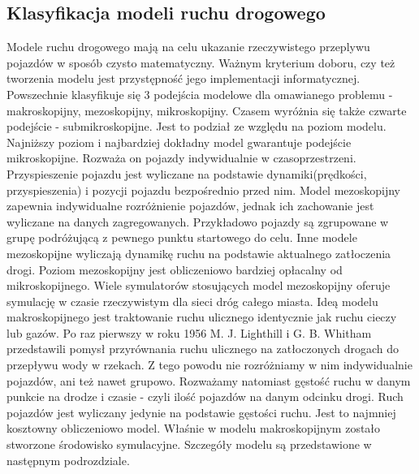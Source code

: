 \documentclass[11pt]{IEEEtran}
\begin{document}
\subsection{Klasyfikacja modeli ruchu drogowego} 
Modele ruchu drogowego mają na celu ukazanie rzeczywistego przeplywu pojazdów w sposób czysto matematyczny. Ważnym kryterium doboru, czy też tworzenia modelu jest przystępność jego implementacji informatycznej. Powszechnie klasyfikuje się 3 podejścia modelowe dla omawianego problemu \cite{CompareModels} - makroskopijny, mezoskopijny, mikroskopijny. Czasem \cite{multilevel} wyróżnia się także czwarte podejście - submikroskopijne. Jest to podział ze względu na poziom modelu. Najniższy poziom i najbardziej dokładny model gwarantuje podejście mikroskopijne. Rozważa on pojazdy indywidualnie w czasoprzestrzeni. Przyspieszenie pojazdu jest wyliczane na podstawie dynamiki(prędkości, przyspieszenia) i pozycji pojazdu bezpośrednio przed nim. Model mezoskopijny zapewnia indywidualne rozróżnienie pojazdów, jednak ich zachowanie jest wyliczane na danych zagregowanych\cite{mesoscopic}. Przykładowo pojazdy są zgrupowane w grupę podróżującą z pewnego punktu startowego do celu. Inne modele \cite{mesoscopic2} mezoskopijne wyliczają dynamikę ruchu na podstawie aktualnego zatłoczenia drogi. Poziom mezoskopijny jest obliczeniowo bardziej opłacalny od mikroskopijnego.
Wiele symulatorów stosujących model mezoskopijny oferuje symulację w czasie rzeczywistym dla sieci dróg całego miasta\cite{vu2017high}. Ideą modelu makroskopijnego jest traktowanie ruchu ulicznego identycznie jak ruchu cieczy lub gazów. Po raz pierwszy w roku 1956 M. J. Lighthill i G. B. Whitham \cite{lwr} przedstawili pomysł przyrównania ruchu ulicznego na zatłoczonych drogach do przepływu wody w rzekach. Z tego powodu nie rozróżniamy w nim indywidualnie pojazdów, ani też nawet grupowo. Rozważamy natomiast gęstość ruchu w danym punkcie na drodze i czasie - czyli ilość pojazdów na danym odcinku drogi. Ruch pojazdów jest wyliczany jedynie na podstawie gęstości ruchu. Jest to najmniej kosztowny obliczeniowo model. Właśnie w modelu makroskopijnym zostało stworzone środowisko symulacyjne. Szczegóły modelu są przedstawione w następnym podrozdziale.
\end{document}
